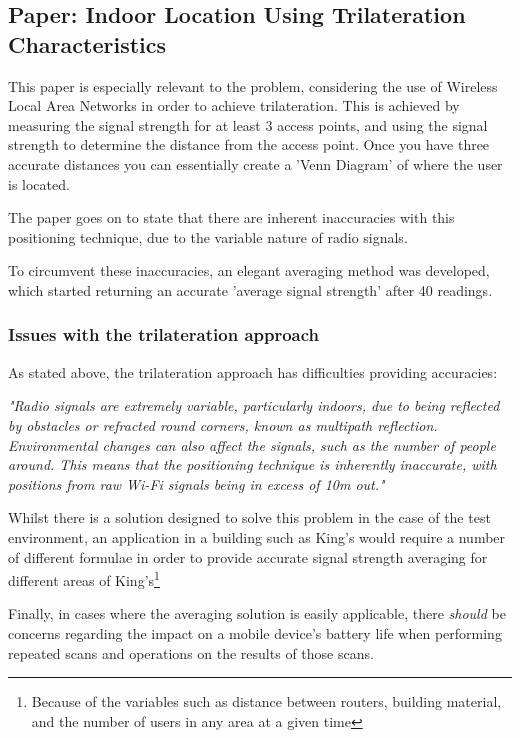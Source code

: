 \documentclass[11pt]{informatics-report}
\begin{document}
\subsection{Paper: Indoor Location Using Trilateration Characteristics\cite{cook2005indoor}}

This paper is especially relevant to the problem, considering the use of Wireless Local Area Networks in order to achieve trilateration. This is achieved by measuring the signal strength for at least 3 access points, and using the signal strength to determine the distance from the access point. Once you have three accurate distances you can essentially create a 'Venn Diagram' of where the user is located.

The paper goes on to state that there are inherent inaccuracies with this positioning technique, due to the variable nature of radio signals\cite{cook2005indoor}. 

To circumvent these inaccuracies, an elegant averaging method was developed, which started returning an accurate 'average signal strength' after 40 readings.

\subsubsection{Issues with the trilateration approach}
As stated above, the trilateration approach has difficulties providing accuracies:

\textit{"Radio signals are extremely variable, particularly indoors, due to being reflected by obstacles or refracted round corners, known as multipath reflection. Environmental changes can also affect the signals, such as the number of people around. This means that the positioning technique is inherently inaccurate, with positions from raw Wi-Fi signals being in excess of 10m out."}\cite{cook2005indoor}

Whilst there is a solution designed to solve this problem in the case of the test environment, an application in a building such as King's would require a number of different formulae in order to provide accurate signal strength averaging for different areas of King's\footnote{Because of the variables such as distance between routers, building material, and the number of users in any area at a given time}

Finally, in cases where the averaging solution is easily applicable, there \textit{should} be concerns regarding the impact on a mobile device's battery life when performing repeated scans and operations on the results of those scans.
\end{document}
